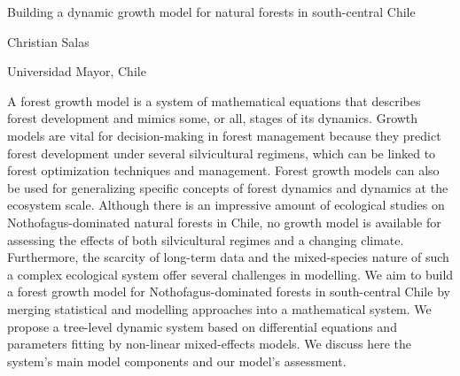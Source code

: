 \documentclass[a4paper]{article}
\begin{document}

\Large
 \begin{center}
Building a dynamic growth model for natural forests in south-central Chile\\ 

\hspace{10pt}

\large
Christian Salas\\

\hspace{10pt}

\small  
Universidad Mayor, Chile\\

\end{center}

\hspace{10pt}

\normalsize
A forest growth model is a system of mathematical equations that describes forest development and mimics some, or all, stages of its dynamics. Growth models are vital for decision-making in forest management because they predict forest development under several silvicultural regimens, which can be linked to forest optimization techniques and management. Forest growth models can also be used for generalizing specific concepts of forest dynamics and dynamics at the ecosystem scale. Although there is an impressive amount of ecological studies on Nothofagus-dominated natural forests in Chile, no growth model is available for assessing the effects of both silvicultural regimes and a changing climate. Furthermore, the scarcity of long-term data and the mixed-species nature of such a complex ecological system offer several challenges in modelling. We aim to build a forest growth model for Nothofagus-dominated forests in south-central Chile by merging statistical and modelling approaches into a mathematical system. We propose a tree-level dynamic system based on differential equations and parameters fitting by non-linear mixed-effects models. We discuss here the system's main model components and our model's assessment.
\end{document}
